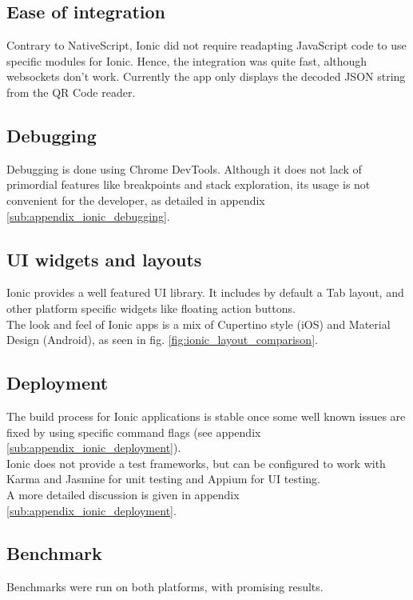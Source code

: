\documentclass[11pt, a4paper, twoside, openright]{article} %
\begin{document}
{\subsection{Ease of integration}
Contrary to NativeScript, Ionic did not require readapting JavaScript code to use specific modules for Ionic. Hence, the integration was quite fast, although websockets don't work. Currently the app only displays the decoded JSON string from the QR Code reader.

\subsection{Debugging}
Debugging is done using Chrome DevTools. Although it does not lack of primordial features like breakpoints and stack exploration, its usage is not convenient for the developer, as detailed in appendix \ref{sub:appendix_ionic_debugging}.

\subsection{UI widgets and layouts}
Ionic provides a well featured UI library. It includes by default a Tab layout, and other platform specific widgets like floating action buttons.\\
The look and feel of Ionic apps is a mix of Cupertino style (iOS) and Material Design (Android), as seen in fig. \ref{fig:ionic_layout_comparison}.

\subsection{Deployment}
The build process for Ionic applications is stable once some well known issues are fixed by using specific command flags (see appendix \ref{sub:appendix_ionic_deployment}).\\

Ionic does not provide a test frameworks, but can be configured to work with Karma and Jasmine for unit testing and Appium for UI testing.\\

A more detailed discussion is given in appendix \ref{sub:appendix_ionic_deployment}.

\subsection{Benchmark}
Benchmarks were run on both platforms, with promising results.\\

}
\end{document}
